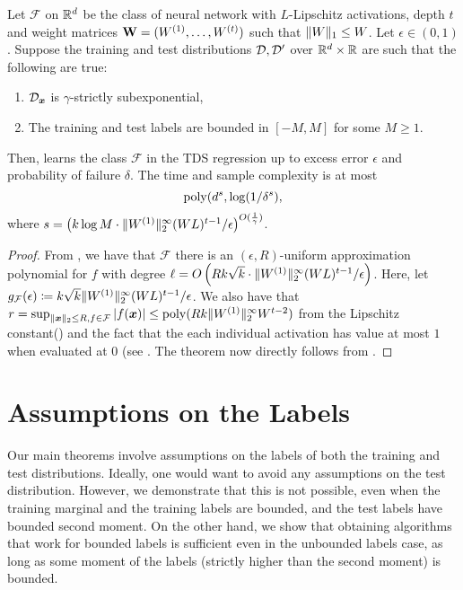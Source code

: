 \begin{theorem}
\label{thm:tds_learning_lipschitz_subexp_appendix}
Let $\mathcal{F}$ on $\mathbb{R}^{d}$ be the class of  neural network with $L$-Lipschitz  activations, depth $t$ and weight matrices $\mathbf{W}=(W^{(1)},\ldots,W^{(t)})$ such that $\|W\|_1\leq W$.  Let $\epsilon\in (0,1)$. Suppose the training and test distributions ${\mathcal{D}},{\mathcal{D}}'$ over $\mathbb{R}^{d}\times \mathbb{R}$ are such that the following are true:
\begin{enumerate}
    \item ${\mathcal{D}}_{{\bm{x}}}$ is $\gamma$-strictly subexponential,
    \item The training and test labels are bounded in $[-M,M]$ for some $M\geq 1$.
\end{enumerate}
Then,  learns the class $\mathcal{F}$ in the TDS regression up to excess error $\epsilon$ and probability of failure $\delta$. The time and sample complexity is at most \[\mathrm{poly}(d^{s},\log(1/\delta^s),\] where $s=\left(k\log M\cdot\|W^{(1)}\|_{2}^{\infty}(WL)^{t-1}/\epsilon\right)^{O(\frac{1}{\gamma})}$.
\end{theorem}
\begin{proof}
    From , we have that $\mathcal{F}$ there is an $(\epsilon, R)$-uniform approximation polynomial for $f$ with degree $\ell=O\left(Rk\sqrt{k}\cdot \|W^{(1)}\|_{2}^{\infty}(WL)^{t-1}/\epsilon\right)$. Here, let $g_{\mathcal{F}}(\epsilon)\coloneq  k\sqrt{k}\|W^{(1)}\|_{2}^{\infty}(WL)^{t-1}/\epsilon$. We also have that $r=\sup_{\|{\bm{x}}\|_{2}\leq R,f\in \mathcal{F}}|f({\bm{x}})|\leq \mathrm{poly}(Rk\|W^{(1)}\|_{2}^{\infty}W^{t-2})$ from the Lipschitz constant() and the fact that the each individual activation has value at most $1$ when evaluated at $0$ (see . The theorem now directly follows from .
\end{proof}




\section{Assumptions on the Labels}\label{appendix:label-assumptions}

Our main theorems involve assumptions on the labels of both the training and test distributions. Ideally, one would want to avoid any assumptions on the test distribution. However, we demonstrate that this is not possible, even when the training marginal and the training labels are bounded, and the test labels have bounded second moment. On the other hand, we show that obtaining algorithms that work for bounded labels is sufficient even in the unbounded labels case, as long as some moment of the labels (strictly higher than the second moment) is bounded.


